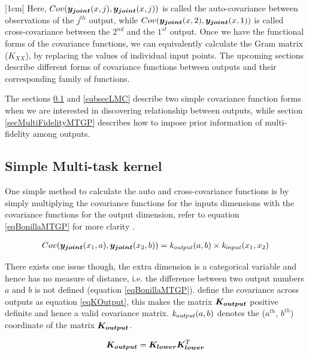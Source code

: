 [1cm]
Here, $Cov(\boldsymbol{y_{joint}}(x, j), \boldsymbol{y_{joint}}(x, j))$ is called the  auto-covariance between observations of the $j^{th}$ output, while $Cov(\boldsymbol{y_{joint}}(x, 2), \boldsymbol{y_{joint}}(x, 1))$ is called cross-covariance between the $2^{nd}$ and the $1^{st}$ output. Once we have the functional forms of the covariance functions, we can equivalently calculate the Gram matrix ($K_{XX}$), by replacing the values of individual input points. The upcoming sections describe different forms of covariance functions between outputs and their corresponding family of functions.

The sections \ref{simpleMultiTask} and \ref{subsecLMC} describe two simple covariance function forms when we are interested in discovering relationship between outputs, while section \ref{secMultiFidelityMTGP} describes how to impose prior information of multi-fidelity among outputs. 

\subsection{Simple Multi-task kernel}\label{simpleMultiTask}

One simple method to calculate the auto and cross-covariance functions is by simply multiplying the covariance functions for the inputs dimensions with the covariance functions for the output dimension, refer to equation \ref{eqBonillaMTGP} for more clarity \cite{bonilla2007multi}.   

\begin{align}\label{eqBonillaMTGP}
    Cov(\boldsymbol{y_{joint}}(x_{1}, a), \boldsymbol{y_{joint}}(x_{2}, b)) = \mathit{k_{output}}(a, b) \times \mathit{k_{input}}(x_{1}, x_{2})
\end{align}

There exists one issue though, the extra dimension is a categorical variable and hence has no measure of distance, i.e. the difference between two output numbers $a$ and $b$ is not defined (equation \ref{eqBonillaMTGP}). \cite{bonilla2007multi} define the covariance across outputs as equation \ref{eqKOutput}, this makes the matrix $\boldsymbol{K_{output}}$ positive definite and hence a valid covariance matrix. $\mathit{k_{output}}(a, b)$ denotes the ($a^{th}$, $b^{th}$) coordinate of the matrix $\boldsymbol{K_{output}}$.

\begin{equation}\label{eqKOutput}
\boldsymbol{K_{output}} = \boldsymbol{K_{lower}}\boldsymbol{K_{lower}}^T
\end{equation}

